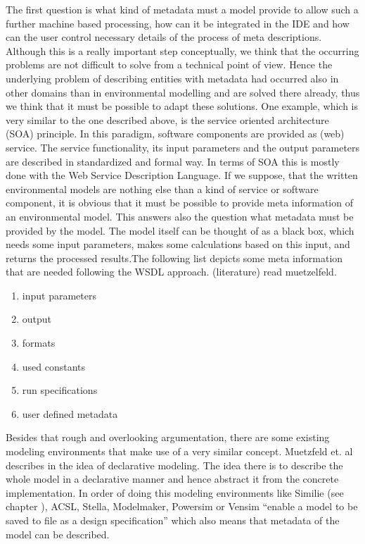 The first question is what kind of metadata must a model provide to allow such a further machine based processing, how can it be integrated in the IDE and how can the user control necessary details of the process of meta descriptions.
Although this is a really important step conceptually, we think that the occurring problems are not difficult to solve from a technical point of view. Hence the underlying problem of describing entities with metadata had occurred also in other domains than in environmental modelling and are solved there already, thus we think that it must be possible to adapt these solutions.
One example, which is very similar to the one described above, is the service oriented architecture (SOA) principle. In this paradigm, software components are provided as (web) service. The service functionality, its input parameters and the output parameters are described in standardized and formal way. In terms of SOA this is mostly done with the Web Service Description Language. If we suppose, that the written environmental models are nothing else than a kind of service or software component, it is obvious that it must be possible to provide meta information of an environmental model. This answers also the question what metadata must be provided by the model. The model itself can be thought of as a black box, which needs some input parameters, makes some calculations based on this input, and returns the processed results.The following list depicts some meta information that are needed following the WSDL approach. (literature) read muetzelfeld.

\begin{enumerate}
\item input parameters
\item output
\item formats
\item used constants
\item run specifications
\item user defined metadata
\end{enumerate}


Besides that rough and overlooking argumentation, there are some existing modeling environments that make use of a very similar concept. Muetzfeld et. al describes in \autocite{dsl:muetzelfeldt} the idea of declarative modeling. The idea there is to describe the whole model in a declarative manner and hence abstract it from the concrete implementation. In order of doing this modeling environments like Similie (see chapter ), ACSL, Stella, Modelmaker, Powersim or Vensim ``enable a model to be saved to file as a design specification'' \autocite[32]{dsl:muetzelfeldt} which also means that metadata of the model can be described.


